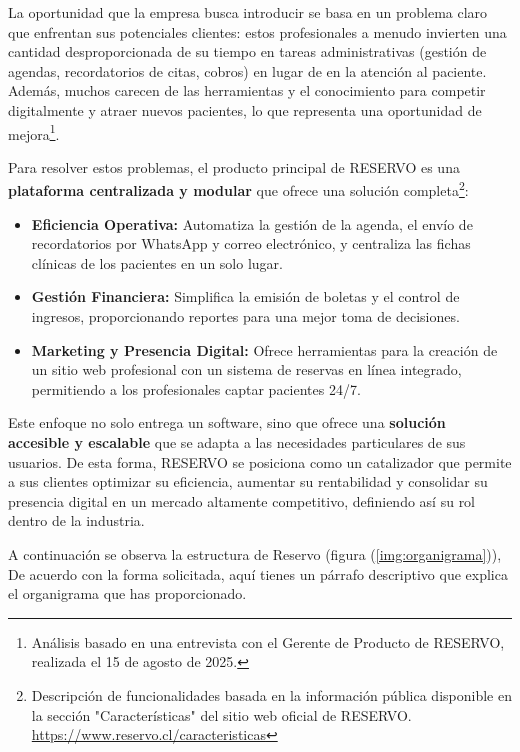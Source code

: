 La oportunidad que la empresa busca introducir se basa en un problema claro que enfrentan sus potenciales clientes: estos profesionales a menudo invierten una cantidad desproporcionada de su tiempo en tareas administrativas (gestión de agendas, recordatorios de citas, cobros) en lugar de en la atención al paciente. Además, muchos carecen de las herramientas y el conocimiento para competir digitalmente y atraer nuevos pacientes, lo que representa una oportunidad de mejora\footnote{Análisis basado en una entrevista con el Gerente de Producto de RESERVO, realizada el 15 de agosto de 2025.}.

Para resolver estos problemas, el producto principal de RESERVO es una \textbf{plataforma centralizada y modular} que ofrece una solución completa\footnote{Descripción de funcionalidades basada en la información pública disponible en la sección "Características" del sitio web oficial de RESERVO. \url{https://www.reservo.cl/caracteristicas}}:

\begin{itemize}
    \item \textbf{Eficiencia Operativa:} Automatiza la gestión de la agenda, el envío de recordatorios por WhatsApp y correo electrónico, y centraliza las fichas clínicas de los pacientes en un solo lugar.
    
    \item \textbf{Gestión Financiera:} Simplifica la emisión de boletas y el control de ingresos, proporcionando reportes para una mejor toma de decisiones.
    
    \item \textbf{Marketing y Presencia Digital:} Ofrece herramientas para la creación de un sitio web profesional con un sistema de reservas en línea integrado, permitiendo a los profesionales captar pacientes 24/7.
\end{itemize}

Este enfoque no solo entrega un software, sino que ofrece una \textbf{solución accesible y escalable} que se adapta a las necesidades particulares de sus usuarios. De esta forma, RESERVO se posiciona como un catalizador que permite a sus clientes optimizar su eficiencia, aumentar su rentabilidad y consolidar su presencia digital en un mercado altamente competitivo, definiendo así su rol dentro de la industria.

A continuación se observa la estructura de Reservo (figura (\ref{img:organigrama})), De acuerdo con la forma solicitada, aquí tienes un párrafo descriptivo que explica el organigrama que has proporcionado.

